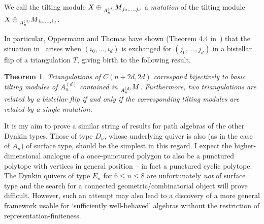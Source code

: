 \documentclass[a4paper,oneside,svgnames,draft]{amsart}
\theoremstyle{plain}
\newtheorem{theorem}{Theorem}[section]
\theoremstyle{definition}
\begin{document}
 We call the tilting module $X \oplus \prescript{}{A^{(d)}_n}M_{j_0,\ldots,j_d}$
 a \emph{mutation} of the tilting module $X \oplus
 \prescript{}{A^{(d)}_n}M_{i_0,\ldots,i_d}$.

 In particular, Oppermann and Thomas have shown (Theorem 4.4 in~\cite{ot}) that
 the situation in~ arises when $(i_0,\ldots,i_d)$ is
 exchanged for $(j_0,\ldots,j_d)$ in a bistellar flip of a triangulation $T$,
 giving birth to the following result.

 \begin{theorem}
  Triangulations of $C(n+2d,2d)$ correspond bijectively to basic tilting modules
  of $A^{(d)}_n$ contained in $\prescript{}{A^{(d)}_n}M$. Furthermore, two
  triangulations are related by a bistellar flip if and only if the
  corresponding tilting modules are related by a single mutation.
 \end{theorem}

 It is my aim to prove a similar string of results for path algebras of the
 other Dynkin types. Those of type $D_n$, whose underlying quiver is also (as in
 the case of $A_n$) of surface type, should be the simplest in this regard. I
 expect the higher-dimensional analogue of a once-punctured polygon to also be a
 punctured polytope with vertices in general position -- in fact a punctured
 cyclic polytope. The Dynkin quivers of type $E_n$ for $6 \leq n \leq 8$ are
 unfortunately \emph{not} of surface type and the search for a connected
 geometric/combinatorial object will prove difficult. However, such an attempt
 may also lead to a discovery of a more general framework usable for
 `sufficiently well-behaved' algebras without the restriction of
 representation-finiteness.
 
\end{document}
